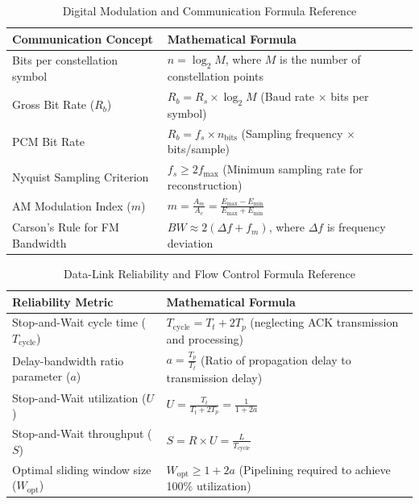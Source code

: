 \begin{table}[htbp]
\centering
\caption{Digital Modulation and Communication Formula Reference}
\label{tab:formulas_digital_communication}
\begin{tabularx}{\textwidth}{p{4.8cm} X}
\toprule
\textbf{Communication Concept} & \textbf{Mathematical Formula} \\
\midrule
Bits per constellation symbol & $n = \log_2 M$, where $M$ is the number of constellation points \\
Gross Bit Rate ($R_b$) & $R_b = R_s \times \log_2 M$ (Baud rate $\times$ bits per symbol) \\
PCM Bit Rate & $R_b = f_s \times n_{\text{bits}}$ (Sampling frequency $\times$ bits/sample) \\
Nyquist Sampling Criterion & $f_s \ge 2 f_{\max}$ (Minimum sampling rate for reconstruction) \\
AM Modulation Index ($m$) & $m = \frac{A_m}{A_c} = \frac{E_{\max} - E_{\min}}{E_{\max} + E_{\min}}$ \\
Carson's Rule for FM Bandwidth & $BW \approx 2(\Delta f + f_m)$, where $\Delta f$ is frequency deviation \\
\bottomrule
\end{tabularx}
\end{table}

\begin{table}[htbp]
\centering
\caption{Data-Link Reliability and Flow Control Formula Reference}
\label{tab:formulas_reliable_transmission}
\begin{tabularx}{\textwidth}{p{4.8cm} X}
\toprule
\textbf{Reliability Metric} & \textbf{Mathematical Formula} \\
\midrule
Stop-and-Wait cycle time ($T_{\text{cycle}}$) & $T_{\text{cycle}} = T_t + 2 T_p$ (neglecting ACK transmission and processing) \\
Delay-bandwidth ratio parameter ($a$) & $a = \frac{T_p}{T_t}$ (Ratio of propagation delay to transmission delay) \\
Stop-and-Wait utilization ($U$) & $U = \frac{T_t}{T_t + 2 T_p} = \frac{1}{1 + 2a}$ \\
Stop-and-Wait throughput ($S$) & $S = R \times U = \frac{L}{T_{\text{cycle}}}$ \\
Optimal sliding window size ($W_{\text{opt}}$) & $W_{\text{opt}} \ge 1 + 2a$ (Pipelining required to achieve 100\% utilization) \\
\bottomrule
\end{tabularx}
\end{table}

